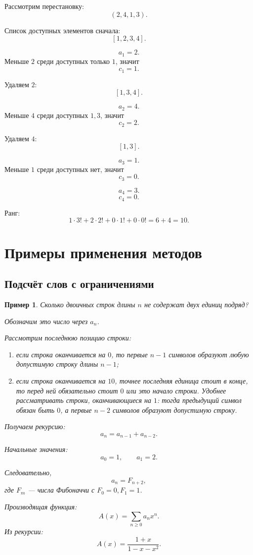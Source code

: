 \documentclass[12pt,a4paper]{article}
\newtheorem{example}{Пример}
\begin{document}
Рассмотрим перестановку:
\[
(2,4,1,3).
\]

Список доступных элементов сначала:
\[
[1,2,3,4].
\]

\[
a_1=2.
\]
Меньше $2$ среди доступных только $1$, значит
\[
c_1=1.
\]

Удаляем $2$:
\[
[1,3,4].
\]

\[
a_2=4.
\]
Меньше $4$ среди доступных $1,3$, значит
\[
c_2=2.
\]

Удаляем $4$:
\[
[1,3].
\]

\[
a_3=1.
\]
Меньше $1$ среди доступных нет, значит
\[
c_3=0.
\]

\[
a_4=3.
\]
\[
c_4=0.
\]

Ранг:
\[
1\cdot 3!+2\cdot 2!+0\cdot 1!+0\cdot 0!
=
6+4=10.
\]

\section{Примеры применения методов}

\subsection{Подсчёт слов с ограничениями}

\begin{example}
Сколько двоичных строк длины $n$ не содержат двух единиц подряд?

Обозначим это число через $a_n$.

Рассмотрим последнюю позицию строки:
\begin{enumerate}
    \item если строка оканчивается на $0$, то первые $n-1$ символов образуют любую допустимую строку длины $n-1$;
    \item если строка оканчивается на $10$, точнее последняя единица стоит в конце, то перед ней обязательно стоит $0$ или это начало строки. Удобнее рассматривать строки, оканчивающиеся на $1$: тогда предыдущий символ обязан быть $0$, а первые $n-2$ символов образуют допустимую строку.
\end{enumerate}

Получаем рекурсию:
\[
a_n=a_{n-1}+a_{n-2}.
\]

Начальные значения:
\[
a_0=1,\qquad a_1=2.
\]

Следовательно,
\[
a_n=F_{n+2},
\]
где $F_m$ --- числа Фибоначчи с $F_0=0,F_1=1$.

Производящая функция:
\[
A(x)=\sum_{n\ge 0}a_nx^n.
\]
Из рекурсии:
\[
A(x)=\frac{1+x}{1-x-x^2}.
\]
\end{example}
\end{document}
